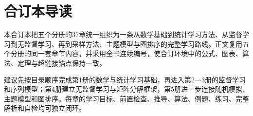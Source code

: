 \documentclass[UTF8,a4paper,11pt,openany]{ctexbook}
\begin{document}
\raggedbottom
\frontmatter
\SLMakeTitle
\chapter*{合订本导读}
本合订本把五个分册的37章统一组织为一条从数学基础到统计学习方法、从监督学习到无监督学习、再到采样方法、主题模型与图排序的完整学习路线。正文复用五个分册的同一套章节内容，并采用全书连续编号，使合订环境中的公式、图表、算法、定理与超链接锚点保持一致。
\begin{keypointbox}
建议先按目录顺序完成第1册的数学与统计学习基础，再进入第2—3册的监督学习和序列模型；第4册建立无监督学习与矩阵分解框架，第5册进一步连接随机模拟、主题模型和图排序。每章的学习目标、前置检查、推导、算法、例题、练习、完整解析和自检均可独立闭环。
\end{keypointbox}
\SLPrintContents
\SLPrintSymbolIndex
\SLPrintFoundationRoutes
\SLBeginMainMatter
{}
\end{document}
